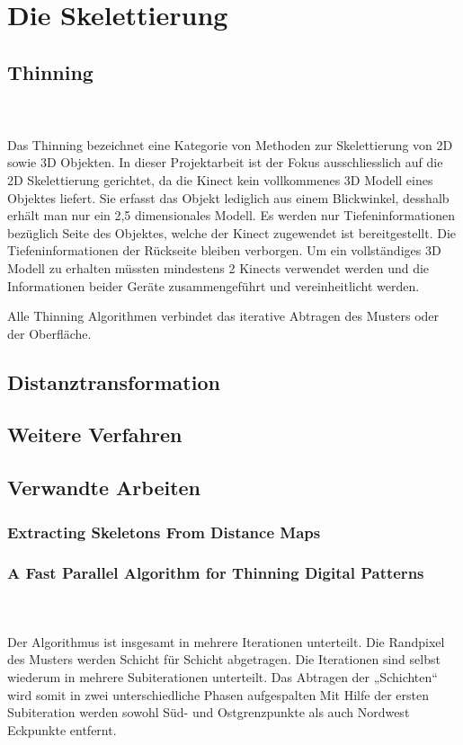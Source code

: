 \chapter{Die Skelettierung}
\section{Thinning}
\\\\
Das Thinning bezeichnet eine Kategorie von Methoden zur Skelettierung von 2D sowie 3D Objekten. In dieser Projektarbeit ist der Fokus ausschliesslich auf die 2D Skelettierung gerichtet, da die Kinect kein vollkommenes 3D Modell eines Objektes liefert. Sie erfasst das Objekt lediglich aus einem Blickwinkel, desshalb erhält man nur ein 2,5 dimensionales Modell. Es werden nur Tiefeninformationen bezüglich Seite des Objektes, welche der Kinect zugewendet ist bereitgestellt. Die  Tiefeninformationen der Rückseite bleiben verborgen. Um ein vollständiges 3D Modell zu erhalten müssten mindestens 2 Kinects verwendet werden und die Informationen beider Geräte zusammengeführt und vereinheitlicht werden. 

Alle Thinning Algorithmen verbindet das iterative Abtragen des Musters oder der Oberfläche.

\section{Distanztransformation}
\section{Weitere Verfahren}
\section{Verwandte Arbeiten}
\subsection{Extracting Skeletons From Distance Maps}
\subsection{A Fast Parallel Algorithm for Thinning Digital Patterns} 
\\\\
Der Algorithmus ist insgesamt in mehrere Iterationen unterteilt. Die Randpixel des Musters werden Schicht für Schicht abgetragen. Die Iterationen sind selbst wiederum in mehrere Subiterationen unterteilt. Das Abtragen der „Schichten“ wird somit in zwei unterschiedliche Phasen aufgespalten
Mit Hilfe der ersten Subiteration werden sowohl Süd- und Ostgrenzpunkte als auch Nordwest Eckpunkte entfernt. \\


